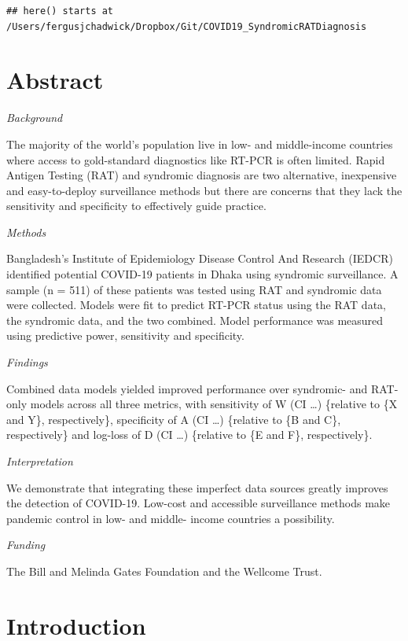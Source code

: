 \documentclass[]{elsarticle} %
\begin{document}
\begin{verbatim}
## here() starts at /Users/fergusjchadwick/Dropbox/Git/COVID19_SyndromicRATDiagnosis
\end{verbatim}

\hypertarget{abstract}{%
\section{Abstract}\label{abstract}}

\emph{Background}

The majority of the world's population live in low- and middle-income
countries where access to gold-standard diagnostics like RT-PCR is often
limited. Rapid Antigen Testing (RAT) and syndromic diagnosis are two
alternative, inexpensive and easy-to-deploy surveillance methods but
there are concerns that they lack the sensitivity and specificity to
effectively guide practice.

\emph{Methods}

Bangladesh's Institute of Epidemiology Disease Control And Research
(IEDCR) identified potential COVID-19 patients in Dhaka using syndromic
surveillance. A sample (n = 511) of these patients was tested using RAT
and syndromic data were collected. Models were fit to predict RT-PCR
status using the RAT data, the syndromic data, and the two combined.
Model performance was measured using predictive power, sensitivity and
specificity.

\emph{Findings}

Combined data models yielded improved performance over syndromic- and
RAT-only models across all three metrics, with sensitivity of W (CI
\ldots) \{relative to \{X and Y\}, respectively\}, specificity of A (CI
\ldots) \{relative to \{B and C\}, respectively\} and log-loss of D (CI
\ldots) \{relative to \{E and F\}, respectively\}.

\emph{Interpretation}

We demonstrate that integrating these imperfect data sources greatly
improves the detection of COVID-19. Low-cost and accessible surveillance
methods make pandemic control in low- and middle- income countries a
possibility.

\emph{Funding}

The Bill and Melinda Gates Foundation and the Wellcome Trust.

\hypertarget{introduction}{%
\section{Introduction}\label{introduction}}
\end{document}
